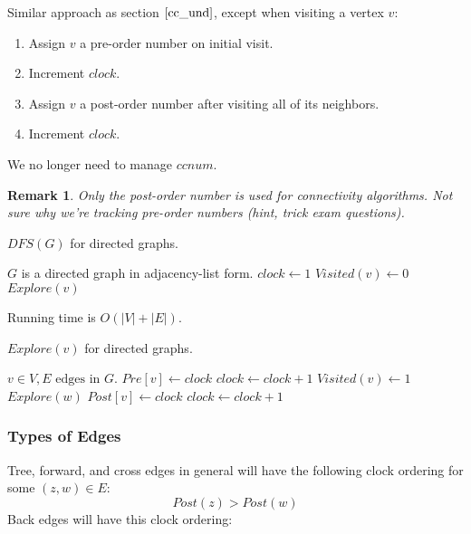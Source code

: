 \documentclass{article}
\newtheorem{remark}{Remark}
\theoremstyle{definition}
\begin{document}
Similar approach as section $\ref{cc_und}$, except when visiting a vertex $v$: 
\begin{enumerate}
\item Assign $v$ a pre-order number on initial visit.
\item Increment $clock$.
\item Assign $v$ a post-order number after visiting all of its neighbors.
\item Increment $clock$.
\end{enumerate}
We no longer need to manage $ccnum$.

\begin{remark}
	Only the post-order number is used for connectivity algorithms. Not sure why we're tracking
	pre-order numbers (hint, trick exam questions).
\end{remark}

\begin{algorithm}
\label{alg:dfs_dir}
\caption{$DFS(G)$ for directed graphs.}
\begin{algorithmic}[1]
\REQUIRE $G$ is a directed graph in adjacency-list form.
\STATE $clock \gets 1$ 
\STATE $Visited(v) \gets 0$
\ENDFOR
{}
\STATE $Explore(v)$
\ENDIF
\ENDFOR
\end{algorithmic}
 Running time is $O(|V|+|E|)$.
\end{algorithm}

\begin{algorithm}
\caption{$Explore(v)$ for directed graphs.}
\begin{algorithmic}[1]
\REQUIRE $v \in V, E \text{ edges in } G$.
\STATE$Pre[v] \gets clock$ 
\STATE $clock \gets clock + 1$
\STATE $Visited(v) \gets 1$
\STATE $Explore(w)$
\STATE $Post[v] \gets clock$ 
\STATE $clock \gets clock + 1$
\ENDIF
\ENDFOR
\end{algorithmic}
\end{algorithm}

\subsubsection{Types of Edges}
Tree, forward, and cross edges in general will have the following clock ordering for some $(z,w) \in E$: $$Post(z) > Post(w)$$ Back edges will have this clock ordering:
\end{document}
